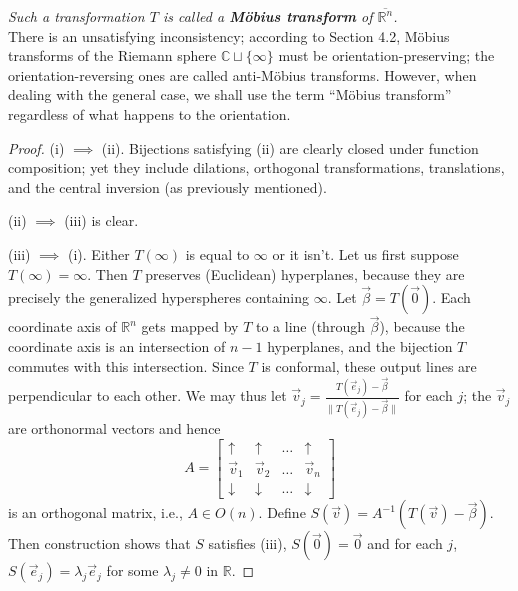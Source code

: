 \documentclass[leqno]{book}
\begin{document}
\emph{Such a transformation $T$ is called a \textbf{M\"obius transform} of $\overline{\mathbb R^n}$.}\\

\noindent There is an unsatisfying inconsistency; according to Section 4.2, M\"obius transforms of the Riemann sphere $\mathbb C\sqcup\{\infty\}$ must be orientation-preserving; the orientation-reversing ones are called anti-M\"obius transforms.  However, when dealing with the general case, we shall use the term ``M\"obius transform'' regardless of what happens to the orientation.
\begin{proof}
(i) $\implies$ (ii). Bijections satisfying (ii) are clearly closed under function composition; yet they include dilations, orthogonal transformations, translations, and the central inversion (as previously mentioned).

(ii) $\implies$ (iii) is clear.

(iii) $\implies$ (i). Either $T(\infty)$ is equal to $\infty$ or it isn't.  Let us first suppose $T(\infty)=\infty$.  Then $T$ preserves (Euclidean) hyperplanes, because they are precisely the generalized hyperspheres containing $\infty$.  Let $\vec\beta=T(\vec 0)$.  Each coordinate axis of $\mathbb R^n$ gets mapped by $T$ to a line (through $\vec\beta$), because the coordinate axis is an intersection of $n-1$ hyperplanes, and the bijection $T$ commutes with this intersection.  Since $T$ is conformal, these output lines are perpendicular to each other.  We may thus let $\vec v_j=\frac{T(\vec e_j)-\vec\beta}{\|T(\vec e_j)-\vec\beta\|}$ for each $j$; the $\vec v_j$ are orthonormal vectors and hence
$$A=\begin{bmatrix}\uparrow&\uparrow&\dots&\uparrow\\\vec v_1&\vec v_2&\dots&\vec v_n\\\downarrow&\downarrow&\dots&\downarrow\end{bmatrix}$$
is an orthogonal matrix, i.e., $A\in O(n)$.  Define $S(\vec v)=A^{-1}(T(\vec v)-\vec\beta)$.  Then construction shows that $S$ satisfies (iii), $S(\vec 0)=\vec 0$ and for each $j$, $S(\vec e_j)=\lambda_j\vec e_j$ for some $\lambda_j\ne 0$ in $\mathbb R$.


\end{proof}
\end{document}
